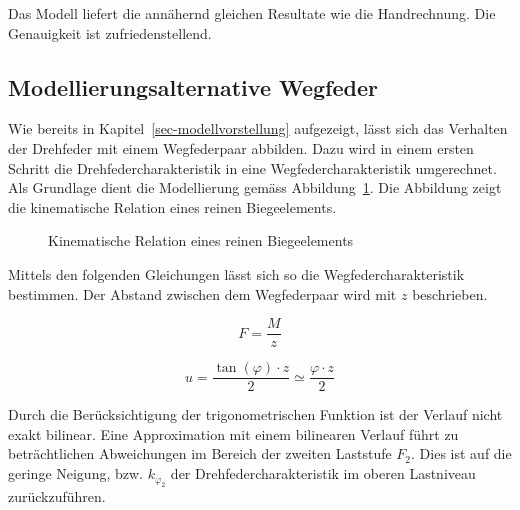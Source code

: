 \documentclass[
  10pt,
  letterpaper,
]{scrreprt}
\begin{document}
Das Modell liefert die annähernd gleichen Resultate wie die
Handrechnung. Die Genauigkeit ist zufriedenstellend.

\subsection{Modellierungsalternative
Wegfeder}\label{modellierungsalternative-wegfeder}

Wie bereits in Kapitel~\ref{sec-modellvorstellung} aufgezeigt, lässt
sich das Verhalten der Drehfeder mit einem Wegfederpaar abbilden. Dazu
wird in einem ersten Schritt die Drehfedercharakteristik in eine
Wegfedercharakteristik umgerechnet. Als Grundlage dient die Modellierung
gemäss Abbildung~\ref{fig-verdrehung_verformung}. Die Abbildung zeigt
die kinematische Relation eines reinen Biegeelements.

\begin{figure}[H]


\caption{\label{fig-verdrehung_verformung}Kinematische Relation eines
reinen Biegeelements}

\end{figure}%

Mittels den folgenden Gleichungen lässt sich so die
Wegfedercharakteristik bestimmen. Der Abstand zwischen dem Wegfederpaar
wird mit \(z\) beschrieben.

\[
F = \frac{M}{z}
\]

\[
u = \frac{\tan(\varphi) \cdot z}{2} \simeq \frac{\varphi \cdot z}{2}
\]

Durch die Berücksichtigung der trigonometrischen Funktion ist der
Verlauf nicht exakt bilinear. Eine Approximation mit einem bilinearen
Verlauf führt zu beträchtlichen Abweichungen im Bereich der zweiten
Laststufe \(F_2\). Dies ist auf die geringe Neigung, bzw.
\(k_{\varphi_2}\) der Drehfedercharakteristik im oberen Lastniveau
zurückzuführen.
\end{document}

